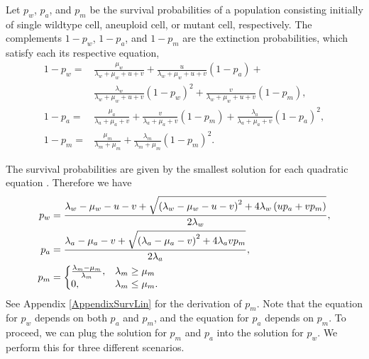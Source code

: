 \documentclass[12pt]{extarticle}
\begin{document}
Let $p_w$, $p_a$, and $p_m$ be the survival probabilities of a population consisting initially of single wildtype cell, aneuploid cell, or mutant cell, respectively.
The complements $1-p_w$, $1-p_a$, and $1-p_m$ are the extinction probabilities, which satisfy each its respective equation,
\begin{equation} \label{extinction_prob}
\begin{aligned}
1-p_w = &\frac{\mu_w}{\lambda_w+\mu_w+u+v} + 
		  \frac{u}{\lambda_w+\mu_w+u+v}\left(1-p_a\right) + \\
		  & \frac{\lambda_w}{\lambda_w+\mu_w+u+v}\left(1-p_w\right)^2 +
		  \frac{v}{\lambda_w+\mu_w+u+v}\left(1-p_m\right) ,\\
1-p_a = &\frac{\mu_a}{\lambda_a+\mu_a+v}+\frac{v}{\lambda_a+\mu_a+v}\left(1-p_m\right)+\frac{\lambda_a}{\lambda_a+\mu_a+v}\left(1-p_a\right)^2 ,\\
1-p_m = &\frac{\mu_m}{\lambda_m+\mu_m}+\frac{\lambda_m}{\lambda_m+\mu_m}\left(1-p_m\right)^2 .	 
\end{aligned}
\end{equation}

The survival probabilities are given by the smallest solution for each quadratic equation \citep{uecker2015adaptive}. Therefore we have
\begin{equation}\label{survival_prob}
\begin{aligned}
p_w &= \frac{\lambda_w-\mu_w-u-v+\sqrt{\left(\lambda_w-\mu_w-u-v\right)^2+4\lambda_w\left(up_a+vp_m\right)}}{2\lambda_w} ,\\
p_a &= \frac{\lambda_a-\mu_a-v+\sqrt{\left(\lambda_a-\mu_a-v\right)^2+4\lambda_avp_m}}{2\lambda_a}, \\
p_m &= \left\{
  \begin{array}{@{}ll@{}}
  \frac{\lambda_m-\mu_m}{\lambda_m},& \lambda_m \ge \mu_m \\
   0, & \lambda_m \le \mu_m . %
  \end{array}\right .  
\end{aligned}
\end{equation}
See Appendix \ref{AppendixSurvLin} for the derivation of $p_m$. %
Note that the equation for $p_w$ depends on both $p_a$ and $p_m$, and the equation for $p_a$ depends on $p_m$.
To proceed, we can plug the solution for $p_m$ and $p_a$ into the solution for $p_w$. We perform this for three different scenarios.
\end{document}
